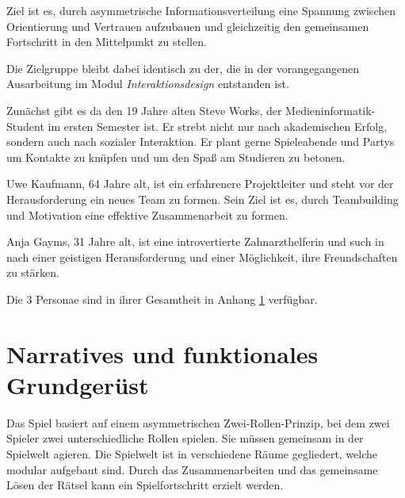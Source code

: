 Ziel ist es, durch asymmetrische Informationsverteilung eine Spannung zwischen Orientierung und Vertrauen aufzubauen und gleichzeitig den gemeinsamen Fortschritt in den Mittelpunkt zu stellen.

Die Zielgruppe bleibt dabei identisch zu der, die in der vorangegangenen Ausarbeitung im Modul \emph{Interaktionsdesign} entstanden ist.

Zunächst gibt es da den 19 Jahre alten Steve Works, der Medieninformatik-Student im ersten Semester ist. Er strebt nicht nur nach akademischen Erfolg, sondern auch nach sozialer Interaktion. Er plant gerne Spieleabende und Partys um Kontakte zu knüpfen und um den Spaß am Studieren zu betonen.

Uwe Kaufmann, 64 Jahre alt, ist ein erfahrenere Projektleiter und steht vor der Herausforderung ein neues Team zu formen. Sein Ziel ist es, durch Teambuilding und Motivation eine effektive Zusammenarbeit zu formen.

Anja Gayms, 31 Jahre alt, ist eine introvertierte Zahnarzthelferin und such in  nach einer geistigen Herausforderung und einer Möglichkeit, ihre Freundschaften zu stärken.

Die 3 Personae sind in ihrer Gesamtheit in Anhang \ref{} verfügbar.


\section{Narratives und funktionales Grundgerüst}
Das Spiel basiert auf einem asymmetrischen Zwei-Rollen-Prinzip, bei dem zwei Spieler zwei unterschiedliche Rollen spielen. Sie müssen gemeinsam in der Spielwelt agieren. Die Spielwelt ist in verschiedene Räume gegliedert, welche modular aufgebaut sind. Durch das Zusammenarbeiten und das gemeinsame Lösen der Rätsel kann ein Spielfortschritt erzielt werden.


